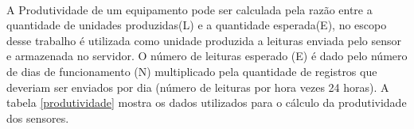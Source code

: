 \begin{center}
\label{disponibilidade}
\end{center}


\\\null \quad A Produtividade de um equipamento pode ser calculada pela razão entre a quantidade de unidades produzidas(L) e a quantidade esperada(E), no escopo desse trabalho é utilizada como unidade produzida a leituras enviada pelo sensor e armazenada no servidor. O número de leituras esperado (E) é dado pelo número de dias de funcionamento (N) multiplicado pela quantidade de registros que deveriam ser enviados por dia (número de leituras por hora vezes 24 horas). A tabela \ref{produtividade} mostra os dados utilizados para o cálculo da produtividade dos sensores.

